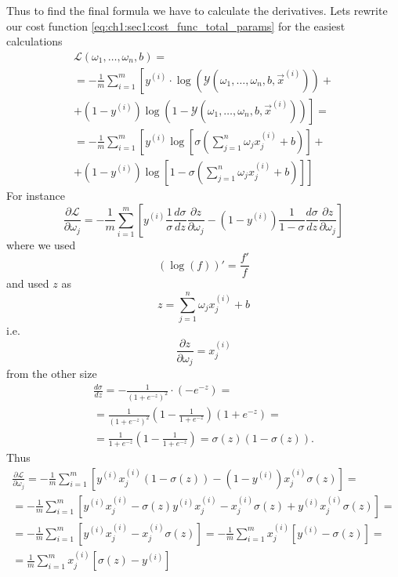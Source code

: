 Thus to find the final formula we have to calculate the derivatives. Lets
rewrite our cost function \cref{eq:ch1:sec1:cost_func_total_params} for the
easiest calculations
\begin{align}
  \mathcal{L}\left(\omega_1, \dots, \omega_n, b\right) =
  \nonumber \\
  = - \frac{1}{m} \sum_{i =
    1}^{m} \left[ y^{(i)} \cdot \log \left(\mathcal{Y}\left(\omega_1, \dots, \omega_n, b,
    \vec{x}^{(i)}\right)\right) + \right .
    \nonumber \\
    + \left .
(1-y^{(i)}) \log \left(1 - \mathcal{Y}\left(\omega_1, \dots, \omega_n, b,
    \vec{x}^{(i)}\right)\right)\right] =
  \nonumber \\
  =
  - \frac{1}{m} \sum_{i =1}^{m} \left[
    y^{(i)} \log \left[\sigma\left(
      \sum_{j=1}^n \omega_j x_j^{(i)} + b\right)\right] +
    \right.
    \nonumber \\
    \left.
    +
(1-y^{(i)}) \log \left[1 - \sigma\left(
    \sum_{j=1}^n \omega_j x_j^{(i)} + b\right)\right]\right]
  \nonumber
\end{align}
For instance
\begin{equation}
 \frac{\partial
   \mathcal{L}}{\partial \omega_j} =
 - \frac{1}{m} \sum_{i =
    1}^{m} \left[ y^{(i)} \frac{1}{\sigma}\frac{d \sigma}{d z}\frac{\partial
     z}{\partial \omega_j} - 
(1-y^{(i)}) \frac{1}{1 - \sigma}\frac{d \sigma}{d z}\frac{\partial
     z}{\partial \omega_j}\right]
 \nonumber
\end{equation}
where we used
\[
\left(\log\left(f\right)\right)' = \frac{f'}{f} 
\]
and used $z$ as
\[
z = \sum_{j=1}^n \omega_j x_j^{(i)} +b 
\]
i.e.
\begin{equation}
  \frac{\partial z}{\partial \omega_j} = x_j^{(i)}
  \nonumber
\end{equation}
from the other size
\begin{align}
  \frac{d \sigma}{d z} = - \frac{1}{\left(1 + e^{-z}\right)^2} \cdot \left( -
  e^{-z}\right) =
  \nonumber \\
  = \frac{1}{\left(1 + e^{-z}\right)^2} \left(1 - \frac{1}{1 +
    e^{-z}}\right)\left(1 + e^{-z}\right) =
  \nonumber \\
  = \frac{1}{1 + e^{-z}} \left(1 - \frac{1}{1 +
    e^{-z}}\right) = \sigma(z) \left(1 - \sigma(z)\right).
  \nonumber 
\end{align}
Thus
\begin{align}
 \frac{\partial
   \mathcal{L}}{\partial \omega_j} =
 - \frac{1}{m} \sum_{i =
    1}^{m} \left[ y^{(i)} x_j^{(i)} (1-\sigma(z)) - 
(1-y^{(i)}) x_j^{(i)} \sigma(z)\right] =
 \nonumber \\
 =
 - \frac{1}{m} \sum_{i =1}^{m}
 \left[ y^{(i)} x_j^{(i)} -\sigma(z) y^{(i)} x_j^{(i)} -
   x_j^{(i)} \sigma(z) + y^{(i)} x_j^{(i)} \sigma(z)\right] =
 \nonumber \\
 =
 - \frac{1}{m} \sum_{i = 1}^{m}
 \left[ y^{(i)} x_j^{(i)} - x_j^{(i)} \sigma(z) \right] =
  - \frac{1}{m} \sum_{i = 1}^{m} x_j^{(i)} \left[ y^{(i)} - \sigma(z) \right] =
  \nonumber \\
  = \frac{1}{m} \sum_{i = 1}^{m} x_j^{(i)} \left[ \sigma(z) - y^{(i)} \right]
  \nonumber
\end{align}
